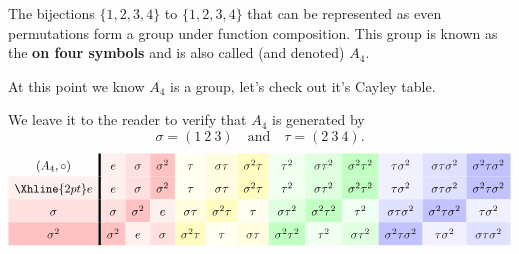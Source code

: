 \documentclass{ximera}
\begin{document}
\begin{example}\label{EG:A4}
  The bijections $\{1,2,3,4\}$ to $\{1,2,3,4\}$ that can be represented
  as even permutations form a group under function composition. This
  group is known as the \textbf{ on four symbols} and is
  also called (and denoted) $A_4$.


  At this point we know $A_4$ is a group, let's check out it's Cayley
  table.

  We leave it to the reader to verify that $A_4$ is generated by
  \[
  \sigma=(1\ 2\ 3)\quad \text{and}\quad \tau = (2\ 3\ 4).
  \]
  \begin{gather*}
    \renewcommand{\arraystretch}{1.6}
      \begin{array}{c!{\vline width 2pt}cccccccccccc}
      (A_{4},\circ)& e\cellcolor{red!6!white}     & \sigma\cellcolor{red!12!white}     & \sigma^2\cellcolor{red!24!white}   & \tau \cellcolor{yellow!6!white}    & \sigma\tau \cellcolor{yellow!12!white}  & \sigma^2 \tau\cellcolor{yellow!24!white} & \tau^2\cellcolor{green!6!white}    &  \sigma \tau^2\cellcolor{green!12!white}  &  \sigma^2 \tau^2\cellcolor{green!24!white} & \tau\sigma^2 \cellcolor{blue!6!white} & \sigma\tau\sigma^2 \cellcolor{blue!12!white}& \sigma^2 \tau \sigma^2\cellcolor{blue!24!white}\\  \Xhline{2pt}
      e \cellcolor{red!6!white}         & e\cellcolor{red!6!white}         & \sigma\cellcolor{red!12!white}           & \sigma^2\cellcolor{red!24!white}   & \tau \cellcolor{yellow!6!white}    & \sigma\tau \cellcolor{yellow!12!white}  & \sigma^2 \tau\cellcolor{yellow!24!white} & \tau^2\cellcolor{green!6!white}    &  \sigma \tau^2\cellcolor{green!12!white}  &  \sigma^2 \tau^2\cellcolor{green!24!white} & \tau\sigma^2 \cellcolor{blue!6!white} & \sigma\tau\sigma^2 \cellcolor{blue!12!white}& \sigma^2 \tau \sigma^2\cellcolor{blue!24!white}\\ 
      \sigma\cellcolor{red!12!white}         & \sigma\cellcolor{red!12!white}        & \sigma^2\cellcolor{red!24!white}            & e\cellcolor{red!6!white}     & \sigma\tau\cellcolor{yellow!12!white} & \sigma^2\tau \cellcolor{yellow!24!white}    & \tau \cellcolor{yellow!6!white}   & \sigma\tau^2 \cellcolor{green!12!white}  & \sigma^2\tau^2 \cellcolor{green!24!white} & \tau^2 \cellcolor{green!6!white} & \sigma \tau\sigma^2 \cellcolor{blue!12!white} & \sigma^2 \tau\sigma^2 \cellcolor{blue!24!white} & \tau\sigma^2 \cellcolor{blue!6!white}\\  
      \sigma^2\cellcolor{red!24!white}       & \sigma^2\cellcolor{red!24!white}      & e\cellcolor{red!6!white}           & \sigma\cellcolor{red!12!white}    & \sigma^2 \tau \cellcolor{yellow!24!white}   & \tau \cellcolor{yellow!6!white} & \sigma\tau \cellcolor{yellow!12!white}   &  \sigma^2\tau^2 \cellcolor{green!24!white}  & \tau^2 \cellcolor{green!6!white} & \sigma\tau^2\cellcolor{green!12!white}  & \sigma^2\tau\sigma^2\cellcolor{blue!24!white} & \tau\sigma^2\cellcolor{blue!6!white} & \sigma\tau\sigma^2\cellcolor{blue!12!white}\\  

\end{array}
\end{gather*}
\end{example}
\end{document}
